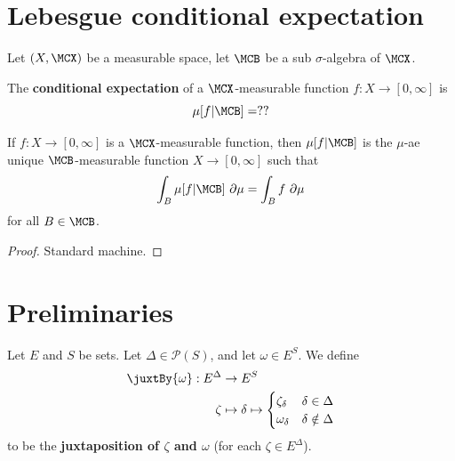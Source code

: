 
\section{Lebesgue conditional expectation}

Let $(X, \MCX)$ be a measurable space, let $\MCB$ be a sub $\sigma$-algebra of $\MCX$.

\begin{definition}
  \label{def:lebesgue-cond-exp}
  \leanok{}

  The {\bf conditional expectation} of a $\MCX$-measurable function $f : X \to [0, \infty]$ is
  \[\mu[f | \MCB] = ??\]
\end{definition}

\begin{lemma}
  \label{lem:lebesgue-cond-exp-char}
  \leanok{}

  If $f : X \to [0, \infty]$ is a $\MCX$-measurable function, then $\mu[f | \MCB]$ is the $\mu$-ae unique $\MCB$-measurable function $X \to [0, \infty]$ such that
  \[\int_B \mu[f | \MCB]\ \partial\mu = \int_B f\ \partial\mu\]
  for all $B \in \MCB$.
\end{lemma}
\begin{proof}

  Standard machine.
\end{proof}


\section{Preliminaries}

\begin{definition}[Juxtaposition]
    \label{def:juxtaposition}
    \leanok{}

    Let $E$ and $S$ be sets. Let $\Delta\in\mathcal{P}(S)$, and let $\omega\in E^S$. We define
    \begin{align}
        \juxtBy{\omega} : E^\Delta&\to E^S\\
        \zeta&\mapsto \delta\mapsto\begin{cases}
            \zeta_\delta & \delta\in\Delta\\
            \omega_\delta & \delta\notin\Delta
        \end{cases}
    \end{align}
    to be the \textbf{juxtaposition of $\zeta$ and $\omega$} (for each $\zeta\in E^\Delta$).
\end{definition}


